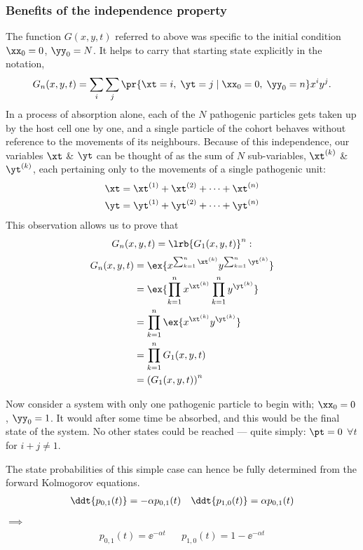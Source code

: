 \subsubsection*{Benefits of the independence property}
The function $G(x,y,t)$ referred to above was specific to the initial condition $\xx_0 = 0$, $\yy_0 = N$. It helps to carry that starting state explicitly in the notation,
\begin{equation*}
G_n(x,y,t) = \sum_i\sum_j \pr{\xt = i,\;\yt=j \;|\;\xx_0 = 0,\;\yy_0=n } x^i y^j.
\end{equation*}
In a process of absorption alone, each of the $N$ pathogenic particles gets taken up by the host cell one by one, and a single particle of the cohort behaves without reference to the movements of its neighbours. Because of this independence, our variables $\xt$ \& $\yt$ can be thought of as the sum of $N$ sub-variables, $\xt^{(k)}$ \& $\yt^{(k)}$, each pertaining only to the movements of a single pathogenic unit:
\begin{align*}
\xt = \xt^{(1)} + \xt^{(2)} + \dots + \xt^{(n)}\\
\yt = \yt^{(1)} + \yt^{(2)} + \dots + \yt^{(n)}
\end{align*}
This observation allows us to prove that
\begin{equation}
\label{indRelPGF}
G_n(x,y,t) = \lrb{G_1(x,y,t)}^n:
\end{equation}
\begin{align*}
G_n(x,y,t) &= \ex{x^{\sum_{k=1}^n \xt^{(k)}} y^{\sum_{k=1}^n \yt^{(k)}}}\\
&=  \ex{\prod_{k=1}^n x^{\xt^{(k)}} \prod_{k=1}^n y^{\yt^{(k)}} }\\
&=  \prod_{k=1}^n\ex{ x^{\xt^{(k)}} y^{\yt^{(k)}} }\\
&=  \prod_{k=1}^n G_1(x,y,t)\\
&= \left(G_1(x,y,t)\right)^n
\end{align*}

\noindent
Now consider a system with only one pathogenic particle to begin with; $\xx_0 = 0$, $\yy_0 = 1$. It would after some time be absorbed, and this would be the final state of the system. No other states could be reached --- quite simply: $\pt = 0$ $\forall t$ for $i+j \neq1$.\par
The state probabilities of this simple case can hence be fully determined from the forward Kolmogorov equations.
\begin{align*}
\ddt{p_{0,1}(t)} = -\alpha p_{0,1}(t) && \ddt{p_{1,0}(t)} = \alpha p_{0,1}(t)
\end{align*}
$\implies$
\begin{align*}
p_{0,1}(t) = \ee^{-\alpha t} && p_{1,0}(t) = 1 - \ee^{-\alpha t}
\end{align*}



